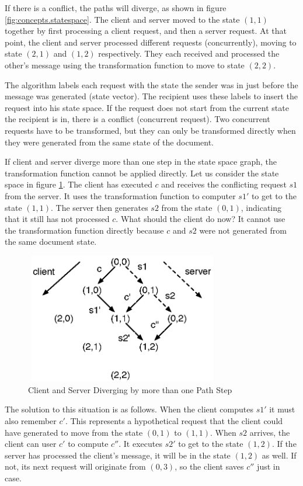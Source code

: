 If there is a conflict, the paths will diverge, as shown in figure \ref{fig:concepts.statespace}. The client and server moved to the state $(1,1)$ together by first processing a client request, and then a server request. At that point, the client and server processed different requests (concurrently), moving to state $(2,1)$ and $(1,2)$ respectively. They each received and processed the other's message using the transformation function to move to state $(2,2)$.

The algorithm labels each request with the state the sender was in just before the message was generated (state vector). The recipient uses these labels to insert the request into his state space. If the request does not start from the current state the recipient is in, there is a conflict (concurrent request). Two concurrent requests have to be transformed, but they can only be transformed directly when they were generated from the same state of the document.

If client and server diverge more than one step in the state space graph, the transformation function cannot be applied directly. Let us consider the state space in figure \ref{fig:concepts.statespace2}. The client has executed $c$ and receives the conflicting request $s1$ from the server. It uses the transformation function to computer $s1'$ to get to the state $(1,1)$. The server then generates $s2$ from the state $(0,1)$, indicating that it still has not processed $c$. What should the client do now? It cannot use the transformation function directly because $c$ and $s2$ were not generated from the same document state.

\begin{figure}[htb]
 \centering
 \includegraphics[width=8.5cm,height=5.7cm]{../../images/concepts_statespace2.eps}
 \caption{Client and Server Diverging by more than one Path Step}
 \label{fig:concepts.statespace2}
\end{figure}

The solution to this situation is as follows. When the client computes $s1'$ it must also remember $c'$. This represents a hypothetical request that the client could have generated to move from the state $(0,1)$ to $(1,1)$. When $s2$ arrives, the client can user $c'$ to compute $c''$. It executes $s2'$ to get to the state $(1,2)$. If the server has processed the client's message, it will be in the state $(1,2)$ as well. If not, its next request will originate from $(0,3)$, so the client saves $c''$ just in case.

